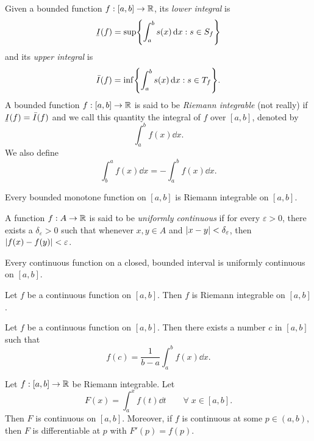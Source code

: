 \documentclass[12pt]{article}
\begin{document}
\begin{defn}[] \label{defn:}
    Given a bounded function $f : [a, b] \to \mathbb{R}$, its \emph{lower integral} is \[
        \ubar{I}(f) = \sup \set{\int_{a}^{b} s(x) \dd x : s \in S_{f}}
    \] and its \emph{upper integral} is \[
        \bar{I}(f) = \inf \set{\int_{a}^{b} s(x) \dd x : s \in T_{f}}.
    \]
    A bounded function $f : [a, b] \to \mathbb{R}$ is said to be \emph{Riemann integrable} (not really) if $\ubar{I}(f) = \bar{I}(f)$ and we call this quantity the integral of $f$ over $[a, b]$, denoted by \[
        \int_{a}^{b} f(x) \dd x.
    \] We also define \[
        \int_{b}^{a} f(x) \dd x = -\int_{a}^{b} f(x) \dd x.
    \]
\end{defn}

\begin{thm} \label{thm:monotone integral}
    Every bounded monotone function on $[a, b]$ is Riemann integrable on $[a, b]$.
\end{thm}

\begin{defn} \label{defn:uniformly continuous}
    A function $f : A \to \mathbb{R}$ is said to be \emph{uniformly continuous} if for every $\varepsilon > 0$, there exists a $\delta_{\varepsilon} > 0$ such that whenever $x, y \in A$ and $\abs{x - y} < \delta_{\varepsilon}$, then $\abs{f(x) - f(y)} < \varepsilon$.
\end{defn}

\begin{thm} \label{thm:integration:uniform_continuity:bounded}
    Every continuous function on a closed, bounded interval is uniformly continuous on $[a, b]$.
\end{thm}

\begin{thm} \label{thm:continuous RI}
    Let $f$ be a continuous function on $[a, b]$. Then $f$ is Riemann integrable on $[a, b]$.
\end{thm}

\begin{thm} \label{thm:mvt int}
    Let $f$ be a continuous function on $[a,b]$.  Then there exists a
    number $c$ in $[a,b]$ such that \[
        f(c) = \frac{1}{b - a} \int_{a}^{b} f(x) \dd x.
    \]
\end{thm}

\begin{thm} \label{thm:integration:IFTOC}
    Let $f : [a, b] \to \mathbb{R}$ be Riemann integrable. Let \[
        F(x) = \int_{a}^{x} f(t) \dd t \qquad \forall\; x \in [a, b].
    \] Then $F$ is continuous on $[a, b]$. Moreover, if $f$ is continuous at some $p \in (a, b)$, then $F$ is differentiable at $p$ with $F'(p) = f(p)$.
\end{thm}
\end{document}
